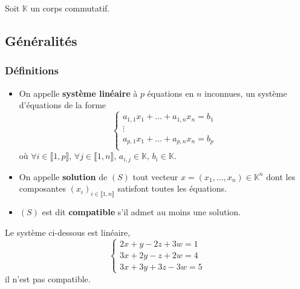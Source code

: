 




  Soit $\mathbb{K}$ un corps commutatif.

  \subsection{Généralités}

  \subsubsection{Définitions}


  \begin{definition}
    \label{162-1}
    \begin{itemize}
      \item On appelle \textbf{système linéaire} à $p$ équations en $n$ inconnues, un système d'équations de la forme
      \[
      \begin{cases}
        a_{1,1} x_1 + \dots + a_{1,n} x_n = b_1 \\
        \vdots \\
        a_{p,1} x_1 + \dots + a_{p,n} x_n = b_p \\
      \end{cases}
      \tag{$S$}
      \]
      où $\forall i \in \llbracket 1, p \rrbracket, \, \forall j \in \llbracket 1, n \rrbracket, \, a_{i,j} \in \mathbb{K}, \, b_i \in \mathbb{K}$.
      \item On appelle \textbf{solution} de $(S)$ tout vecteur $x = (x_1, \dots, x_n) \in \mathbb{K}^n$ dont les composantes $(x_i)_{i \in \llbracket 1, n \rrbracket}$ satisfont toutes les équations.
      \item $(S)$ est dit \textbf{compatible} s'il admet au moins une solution.
    \end{itemize}
  \end{definition}


  \begin{example}
    Le système ci-dessous est linéaire,
    \[
      \begin{cases}
        2x + y - 2z + 3w = 1 \\
        3x + 2y - z + 2w = 4 \\
        3x + 3y + 3z - 3w = 5
      \end{cases}
    \]
    il n'est pas compatible.
  \end{example}

